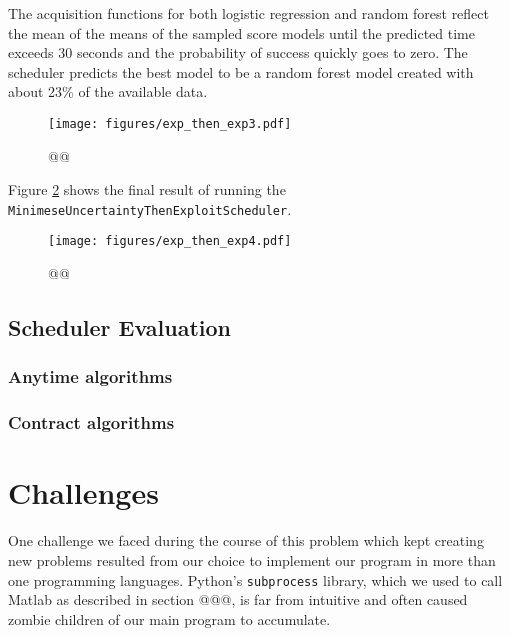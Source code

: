 \documentclass[a4paper,12pt,twoside,openright]{report}
\begin{document}
The acquisition functions for both logistic regression and random forest reflect the mean of the means of the sampled score models until the predicted time exceeds 30 seconds and the probability of success quickly goes to zero. The scheduler predicts the best model to be a random forest model created with about 23\% of the available data.

\begin{figure}
\centering
  \texttt{[image: figures/exp\_then\_exp3.pdf]}
  \caption{@@}
  \label{sched:exp_then_exp3}
\end{figure}

Figure \ref{sched:exp_then_exp4} shows the final result of running the \texttt{MinimeseUncertaintyThenExploitScheduler}. %

\begin{figure}
\centering
  \texttt{[image: figures/exp\_then\_exp4.pdf]}
  \caption{@@}
  \label{sched:exp_then_exp4}
\end{figure}


\subsection{Scheduler Evaluation}

\subsubsection{Anytime algorithms}

\subsubsection{Contract algorithms}






\section{Challenges}
One challenge we faced during the course of this problem which kept creating new problems resulted from our choice to implement our program in more than one programming languages. Python's \texttt{subprocess} library, which we used to call Matlab as described in section @@@, is far from intuitive and often caused zombie children of our main program to accumulate. 
\end{document}
